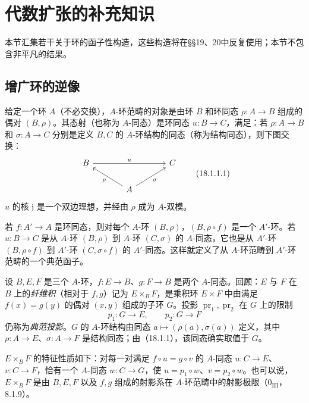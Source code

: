 \setcounter{section}{17}
\section{代数扩张的补充知识}
本节汇集若干关于环的函子性构造，这些构造将在§§19、20中反复使用；本节不包含非平凡的结果。

\subsection{增广环的逆像}
给定一个环 $A$（不必交换），$A$-环范畴的对象是由环 $B$ 和环同态 $\rho:A\to B$ 组成的偶对 $(B,\rho)$。其态射（也称为 $A$-同态）是环同态 $u:B\to C$，满足：若 $\rho:A\to B$ 和 $\sigma:A\to C$ 分别是定义 $B,C$ 的 $A$-环结构的同态（称为结构同态），则下图交换：
\begin{equation}
\begin{tikzcd}[column sep=large]
 B\arrow[rr,"u"] && C\\
 & A\arrow[ul,"\rho"]\arrow[ur,"\sigma"'] &
\end{tikzcd}
\tag{18.1.1.1}
\end{equation}
$u$ 的核 $\mathfrak j$ 是一个双边理想，并经由 $\rho$ 成为 $A$-双模。

若 $f:A'\to A$ 是环同态，则对每个 $A$-环 $(B,\rho)$，$(B,\rho\circ f)$ 是一个 $A'$-环。若 $u:B\to C$ 是从 $A$-环 $(B,\rho)$ 到 $A$-环 $(C,\sigma)$ 的 $A$-同态，它也是从 $A'$-环 $(B,\rho\circ f)$ 到 $A'$-环 $(C,\sigma\circ f)$ 的 $A'$-同态。这样就定义了从 $A$-环范畴到 $A'$-环范畴的一个典范函子。

设 $B,E,F$ 是三个 $A$-环，$f:E\to B$、$g:F\to B$ 是两个 $A$-同态。回顾：$E$ 与 $F$ 在 $B$ 上的\emph{纤维积}（相对于 $f,g$）记为 $E\times_BF$，是乘积环 $E\times F$ 中由满足 $f(x)=g(y)$ 的偶对 $(x,y)$ 组成的子环 $G$。投影 $\operatorname{pr}_1,\operatorname{pr}_2$ 在 $G$ 上的限制
\[
 p_1:G\longrightarrow E,\qquad p_2:G\longrightarrow F
\]
仍称为\emph{典范投影}。$G$ 的 $A$-环结构由同态 $a\mapsto(\rho(a),\sigma(a))$ 定义，其中 $\rho:A\to E$、$\sigma:A\to F$ 是结构同态；由（18.1.1），该同态确实取值于 $G$。

$E\times_BF$ 的特征性质如下：对每一对满足 $f\circ u=g\circ v$ 的 $A$-同态 $u:C\to E$、$v:C\to F$，恰有一个 $A$-同态 $w:C\to G$，使 $u=p_1\circ w$、$v=p_2\circ w$。也可以说，$E\times_BF$ 是由 $B,E,F$ 以及 $f,g$ 组成的射影系在 $A$-环范畴中的射影极限（$0_{\mathrm{III}}$，8.1.9）。

